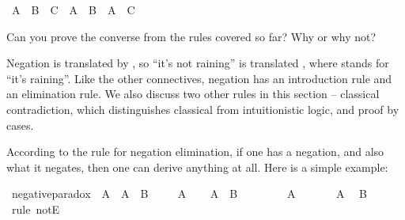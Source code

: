 \begin{isabellebody}
\begin{isamarkuptext}
\end{isamarkuptext}\isamarkuptrue%
\isamarkupfalse%
\ {\isachardoublequoteopen}A\ {\isasymor}\ B\ {\isasymand}\ C\ {\isasymlongrightarrow}\ {\isacharparenleft}A\ {\isasymor}\ B{\isacharparenright}\ {\isasymand}\ {\isacharparenleft}A\ {\isasymor}\ C{\isacharparenright}{\isachardoublequoteclose}%
\isadelimproof
\ %
\endisadelimproof
%
\isatagproof
{}\isamarkupfalse%
%
\endisatagproof
{\isafoldproof}%
%
\isadelimproof
%
\endisadelimproof
%
\begin{isamarkuptext}%
Can you prove the converse from the rules covered so far? Why or why not?%
\end{isamarkuptext}\isamarkuptrue%
%
\isamarkuptrue%
%
\begin{isamarkuptext}%
Negation is translated by \isa{{\isasymnot}}, so ``it's not raining'' is translated ,
where  stands for ``it's raining''. Like the other connectives, negation has an introduction
rule and an elimination rule. We also discuss two other rules in this section -- classical contradiction,
which distinguishes classical from intuitionistic logic, and proof by cases.%
\end{isamarkuptext}\isamarkuptrue%
%
\isamarkuptrue%
%
\begin{isamarkuptext}%
According to the rule for negation elimination, if one has a negation, and also what it
negates, then one can derive anything at all. Here is a simple example:%
\end{isamarkuptext}\isamarkuptrue%
\isamarkupfalse%
\ negative{\isacharunderscore}paradox{\isacharcolon}\ {\isachardoublequoteopen}{\isasymnot}\ A\ {\isasymlongrightarrow}\ A\ {\isasymlongrightarrow}\ B{\isachardoublequoteclose}\isanewline
%
\isadelimproof
%
\endisadelimproof
%
\isatagproof
{}\isamarkupfalse%
\isanewline
\ \ \isamarkupfalse%
\ {\isachardoublequoteopen}{\isasymnot}\ A{\isachardoublequoteclose}\isanewline
\ \ \isamarkupfalse%
\ {\isachardoublequoteopen}A\ {\isasymlongrightarrow}\ B{\isachardoublequoteclose}\isanewline
\ \ \isamarkupfalse%
\isanewline
\ \ \ \ \isamarkupfalse%
\ {\isachardoublequoteopen}A{\isachardoublequoteclose}\isanewline
\ \ \ \ \isamarkupfalse%
\ {\isacharbackquoteopen}{\isasymnot}\ A{\isacharbackquoteclose}\ \isamarkupfalse%
\ B\ \isamarkupfalse%
\ {\isacharparenleft}rule\ notE{\isacharparenright}\isanewline

\end{isabellebody}
